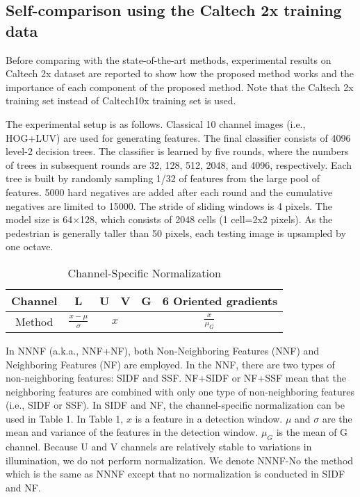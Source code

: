\documentclass[10pt,twocolumn,letterpaper]{article}
\begin{document}
\subsection{Self-comparison using the Caltech 2x training data }

Before comparing with the state-of-the-art methods, experimental results on 
Caltech 2x dataset are reported to show how the proposed method works and 
the importance of each component of the proposed method. Note that the 
Caltech 2x training set instead of Caltech10x training set is used. 

The experimental setup is as follows. Classical 10 channel images (i.e., 
HOG+LUV) are used for generating features. The final classifier consists of 
4096 level-2 decision trees. The classifier is learned by five rounds, where 
the numbers of trees in subsequent rounds are 32, 128, 512, 2048, and 4096, 
respectively. Each tree is built by randomly sampling 1/32 of features from 
the large pool of features. 5000 hard negatives are added after each round 
and the cumulative negatives are limited to 15000. The stride of sliding 
windows is 4 pixels. The model size is 64$\times $128, which consists of 
2048 cells (1 cell=2x2 pixels). As the pedestrian is generally taller than 50 
pixels, each testing image is upsampled by one octave. 

\begin{table}
\begin{center}
\centering
\begin{tabular}{|c|c|c|c|c|c|}
\hline
Channel & L & U & V & G & 6 Oriented gradients \\
\hline
Method & $\frac{x-\mu}{\sigma}$ & \multicolumn{2}{c|}{$x$}   & \multicolumn{2}{c|}{$\frac{x}{\mu_G}$}\\
\hline
\end{tabular}
\end{center}
\caption{Channel-Specific Normalization}
\end{table}

In NNNF (a.k.a., NNF+NF), both Non-Neighboring Features (NNF) and 
Neighboring Features (NF) are employed. In the NNF, there are two types of 
non-neighboring features: SIDF and SSF. NF+SIDF or NF+SSF mean that 
the neighboring features are combined with only one type of non-neighboring features (i.e., 
SIDF or SSF). In SIDF and NF, the channel-specific 
normalization can be used in Table 1. In Table 1, $x$ is a feature in a detection window. $\mu$ and $\sigma$ are the mean and variance of the features in the detection window. $\mu_G$ is the mean of G channel. Because U and V channels are relatively stable to variations in illumination, we do not perform normalization. We denote NNNF-No the 
method which is the same as NNNF except that no normalization is conducted 
in SIDF and NF. 
\end{document}
